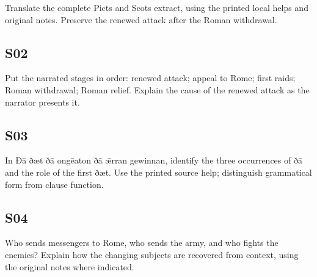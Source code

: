 \par\begin{minipage}{\linewidth}\raggedright
Translate the complete Picts and Scots extract, using the printed local helps and original notes. Preserve the renewed attack after the Roman withdrawal.

\end{minipage}\par\addvspace{4pt}

\subsection*{S02}

\par\begin{minipage}{\linewidth}\raggedright
Put the narrated stages in order: renewed attack; appeal to Rome; first raids; Roman withdrawal; Roman relief. Explain the cause of the renewed attack as the narrator presents it.

\end{minipage}\par\addvspace{4pt}

\subsection*{S03}

\par\begin{minipage}{\linewidth}\raggedright
In Ðā ðæt ðā ongēaton ðā ǣrran gewinnan, identify the three occurrences of ðā and the role of the first ðæt. Use the printed source help; distinguish grammatical form from clause function.

\end{minipage}\par\addvspace{4pt}

\subsection*{S04}

\par\begin{minipage}{\linewidth}\raggedright
Who sends messengers to Rome, who sends the army, and who fights the enemies? Explain how the changing subjects are recovered from context, using the original notes where indicated.

\end{minipage}\par\addvspace{4pt}

